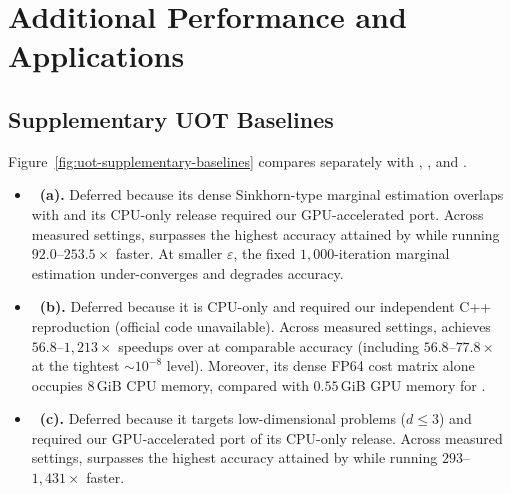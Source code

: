 \section{Additional Performance and Applications}
\label{app:additional-performance}



\subsection{Supplementary UOT Baselines}
\label{app:uot-supplementary-baselines}

Figure~\ref{fig:uot-supplementary-baselines} compares \ours separately with \etm, \adnsuot, and \multiscaleot.
\begin{itemize}
\item \textbf{\etm\ (a).}
Deferred because its dense Sinkhorn-type marginal estimation overlaps with \sinkhorn and its CPU-only release required our GPU-accelerated port.
Across measured settings, \ours surpasses the highest accuracy attained by \etm while running $92.0$--$253.5\times$ faster.
At smaller $\varepsilon$, the fixed $1{,}000$-iteration marginal estimation under-converges and degrades accuracy.

\item \textbf{\adnsuot\ (b).}
Deferred because it is CPU-only and required our independent C++ reproduction (official code unavailable).
Across measured settings, \ours achieves $56.8$--$1{,}213\times$ speedups over \adnsuot at comparable accuracy (including $56.8$--$77.8\times$ at the tightest ${\sim}10^{-8}$ level).
Moreover, its dense FP64 cost matrix alone occupies $8$\,GiB CPU memory, compared with $0.55$\,GiB GPU memory for \ours.

\item \textbf{\multiscaleot\ (c).}
Deferred because it targets low-dimensional problems ($d\leq 3$) and required our GPU-accelerated port of its CPU-only release.
Across measured settings, \ours surpasses the highest accuracy attained by \multiscaleot while running $293$--$1{,}431\times$ faster.
\end{itemize}

